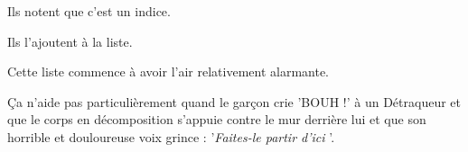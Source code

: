 Ils notent que c'est un indice.

Ils l'ajoutent à la liste.

Cette liste commence à avoir l'air relativement alarmante.

Ça n'aide pas particulièrement quand le garçon crie 'BOUH !' à un Détraqueur et que le corps en décomposition s'appuie contre le mur derrière lui et que son horrible et douloureuse voix grince : '\emph{Faites-le partir d'ici} '.

